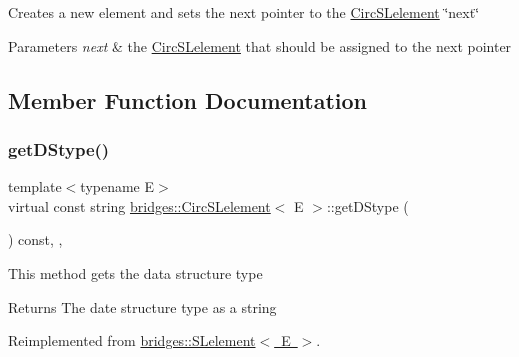 Creates a new element and sets the next pointer to the \mbox{\hyperlink{classbridges_1_1_circ_s_lelement}{Circ\+S\+Lelement}} \char`\"{}next\char`\"{} 
\begin{DoxyParams}{Parameters}
{\em next} & the \mbox{\hyperlink{classbridges_1_1_circ_s_lelement}{Circ\+S\+Lelement}} that should be assigned to the next pointer \\
\hline
\end{DoxyParams}


\subsection{Member Function Documentation}
\mbox{\label{classbridges_1_1_circ_s_lelement_a4b27c205af46162371e3ffe05cbbe3d5}} 
\subsubsection{\texorpdfstring{get\+D\+Stype()}{getDStype()}}
{\footnotesize\ttfamily template$<$typename E$>$ \\
virtual const string \mbox{\hyperlink{classbridges_1_1_circ_s_lelement}{bridges\+::\+Circ\+S\+Lelement}}$<$ E $>$\+::get\+D\+Stype (\begin{DoxyParamCaption}{ }\end{DoxyParamCaption}) const\hspace{0.3cm}{\ttfamily [inline]}, {\ttfamily [override]}, {\ttfamily [virtual]}}

This method gets the data structure type

\begin{DoxyReturn}{Returns}
The date structure type as a string 
\end{DoxyReturn}


Reimplemented from \mbox{\hyperlink{classbridges_1_1_s_lelement_a136330b3481a47b3edb429f323274655}{bridges\+::\+S\+Lelement$<$ E $>$}}.

\mbox{\label{classbridges_1_1_circ_s_lelement_aab863627c125c6f1075af7e7b7f340cf}} 
